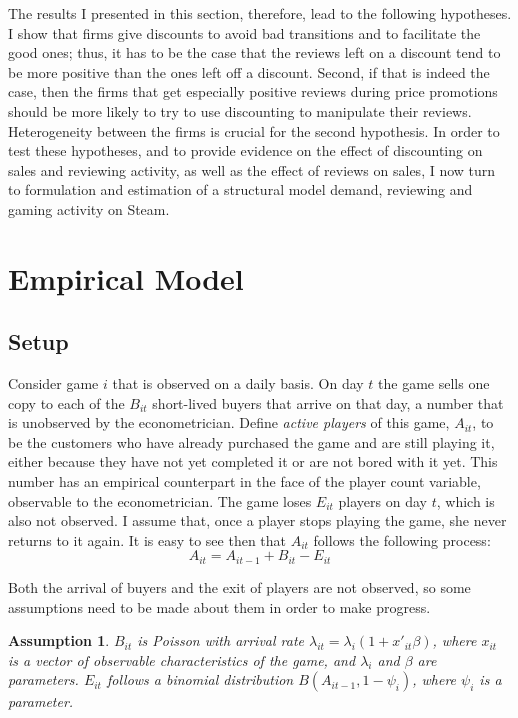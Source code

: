 \documentclass[12pt,pagebackref]{article}
\newtheorem{assumption}{Assumption}[section]
\begin{document}
The results I presented in this section, therefore, lead to the
following hypotheses. I show that firms give discounts to avoid bad
transitions and to facilitate the good ones; thus, it has to be the case
that the reviews left on a discount tend to be more positive than the
ones left off a discount. Second, if that is indeed the case, then the
firms that get especially positive reviews during price promotions
should be more likely to try to use discounting to manipulate their
reviews. Heterogeneity between the firms is crucial for the second
hypothesis. In order to test these hypotheses, and to provide evidence
on the effect of discounting on sales and reviewing activity, as well as
the effect of reviews on sales, I now turn to formulation and estimation
of a structural model demand, reviewing and gaming activity on Steam.

\hypertarget{empirical-model}{%
\section{Empirical Model}\label{empirical-model}}

\hypertarget{setup}{%
\subsection{Setup}\label{setup}}

Consider game \(i\) that is observed on a daily basis. On day \(t\) the
game sells one copy to each of the \(B_{it}\) short-lived buyers that
arrive on that day, a number that is unobserved by the econometrician.
Define \emph{active players} of this game, \(A_{it}\), to be the
customers who have already purchased the game and are still playing it,
either because they have not yet completed it or are not bored with it
yet. This number has an empirical counterpart in the face of the player
count variable, observable to the econometrician. The game loses
\(E_{it}\) players on day \(t\), which is also not observed. I assume
that, once a player stops playing the game, she never returns to it
again. It is easy to see then that \(A_{it}\) follows the following
process: \begin{equation}\label{activeProccess}
  A_{it} = A_{it-1} + B_{it} - E_{it}
\end{equation}

Both the arrival of buyers and the exit of players are not observed, so
some assumptions need to be made about them in order to make progress.

\begin{assumption}\label{arrivalAssumptions}
$B_{it}$ is Poisson with arrival rate $\lambda_{it} = \lambda_i(1+x'_{it}\beta)$, where $x_{it}$ is a vector of observable characteristics of the game, and $\lambda_i$ and $\beta$ are parameters. $E_{it}$ follows a binomial distribution $B(A_{it-1}, 1-\psi_i)$, where $\psi_i$ is a parameter.
\end{assumption}
\end{document}
